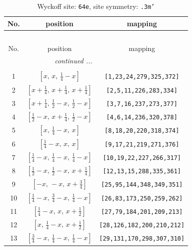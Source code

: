 \documentclass[fleqn,8pt]{jsarticle}
\begin{document}
\begin{longtable}{ccc}
\caption{Wyckoff site: {\tt 64e}, site symmetry: {\tt .3m'}}
 \\
 \hline \hline
No. & position & mapping \\ \hline \endfirsthead

\multicolumn{2}{l}{\tablename\ \thetable{}} \\
 \hline \hline
No. & position & mapping \\ \hline \endhead

 \hline \hline
\multicolumn{2}{r}{\footnotesize\it continued ...} \\ \endfoot

 \hline \hline
\multicolumn{2}{r}{} \\ \endlastfoot

1 & $\left[ x,\, x,\, \frac{1}{4} - x \right]$ & {\tt [1,23,24,279,325,372]} \\ \hline
2 & $\left[ x + \frac{1}{4},\, x + \frac{1}{4},\, x + \frac{1}{4} \right]$ & {\tt [2,5,11,226,283,334]} \\ \hline
3 & $\left[ x + \frac{1}{4},\, \frac{1}{2} - x,\, \frac{1}{2} - x \right]$ & {\tt [3,7,16,237,273,377]} \\ \hline
4 & $\left[ \frac{1}{2} - x,\, x + \frac{1}{4},\, \frac{1}{2} - x \right]$ & {\tt [4,6,14,236,320,378]} \\ \hline
5 & $\left[ x,\, \frac{1}{4} - x,\, x \right]$ & {\tt [8,18,20,220,318,374]} \\ \hline
6 & $\left[ \frac{1}{4} - x,\, x,\, x \right]$ & {\tt [9,17,21,219,271,376]} \\ \hline
7 & $\left[ \frac{1}{4} - x,\, \frac{1}{4} - x,\, \frac{1}{4} - x \right]$ & {\tt [10,19,22,227,266,317]} \\ \hline
8 & $\left[ \frac{1}{2} - x,\, \frac{1}{2} - x,\, x + \frac{1}{4} \right]$ & {\tt [12,13,15,288,335,361]} \\ \hline
9 & $\left[ - x,\, - x,\, x + \frac{3}{4} \right]$ & {\tt [25,95,144,348,349,351]} \\ \hline
10 & $\left[ \frac{1}{4} - x,\, \frac{3}{4} - x,\, \frac{1}{4} - x \right]$ & {\tt [26,83,173,250,259,262]} \\ \hline
11 & $\left[ \frac{1}{4} - x,\, x,\, x + \frac{1}{2} \right]$ & {\tt [27,79,184,201,209,213]} \\ \hline
12 & $\left[ x,\, \frac{1}{4} - x,\, x + \frac{1}{2} \right]$ & {\tt [28,126,182,200,210,212]} \\ \hline
13 & $\left[ \frac{3}{4} - x,\, \frac{1}{4} - x,\, \frac{1}{4} - x \right]$ & {\tt [29,131,170,298,307,310]} \\ \hline

\end{longtable}
\end{document}
